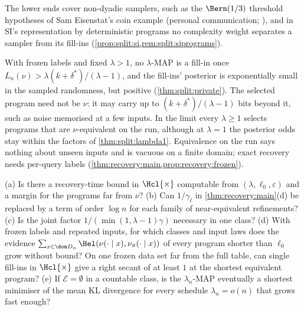 The lower ends cover non-dyadic samplers, such as the $\Bern(1/3)$ threshold hypotheses of Sam Eisenstat's coin example (personal communication; \citealp[Section~7.3]{claudeSFI2026fundamentals}), %
and in SI's representation by deterministic programs no complexity weight separates a sampler from its fill-ins (\cref{prop:split:si,rem:split:siprograms}).

\begin{remark}\label{rem:split:reading}
With frozen labels and fixed $\lambda>1$, no $\lambda$-MAP is a fill-in once $L_n(\nu)>\lambda(k+\delta^*)/(\lambda-1)$, and the fill-ins' posterior is exponentially small in the sampled randomness, but positive (\cref{thm:split:private}). The selected program need not be $\nu$: it may carry up to $(k+\delta^*)/(\lambda-1)$ bits beyond it, such as noise memorised at a few inputs. In the limit every $\lambda\ge1$ selects programs that are $\nu$-equivalent on the run, although at $\lambda=1$ the posterior odds stay within the factors of \cref{thm:split:lambda1}. Equivalence on the run says nothing about unseen inputs and is vacuous on a finite domain; exact recovery needs per-query labels (\cref{thm:recovery:main,prop:recovery:frozen}).
\end{remark}

\begin{question}\label{q:recovery:open}
(a) Is there a recovery-time bound in $\Hcl{\times}$ computable from $(\lambda,\ell_0,\varepsilon)$ and a margin for the programs far from $\nu$? (b) Can $1/\gamma_{\bar\ell}$ in \cref{thm:recovery:main}(d) be replaced by a term of order $\log n$ for each family of near-equivalent refinements? (c) Is the joint factor $1/(\min(1,\lambda-1)\gamma)$ necessary in one class? (d) With frozen labels and repeated inputs, for which classes and input laws does the evidence $\sum_{x\in\dom D_n}\Hel(\nu(\cdot\mid x),\nu_\pi(\cdot\mid x))$ of every program shorter than $\ell_0$ grow without bound? On one frozen data set far from the full table, can single fill-ins in $\Hcl{\times}$ give a right secant of at least $1$ at the shortest equivalent program? (e) If $\mathcal E=\emptyset$ in a countable class, is the $\lambda_n$-MAP eventually a shortest minimiser of the mean KL divergence for every schedule $\lambda_n=o(n)$ that grows fast enough?
\end{question}
